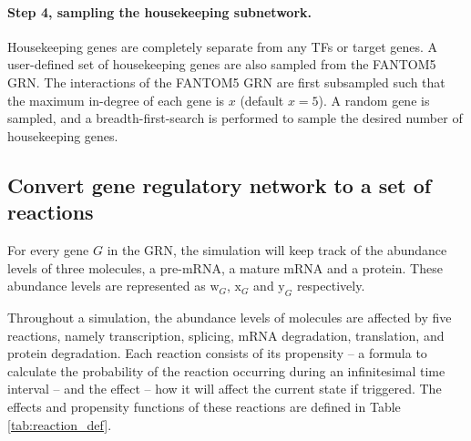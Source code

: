 \paragraph{Step 4, sampling the housekeeping subnetwork.}
Housekeeping genes are completely separate from any TFs or target genes. A user-defined set of housekeeping genes are also sampled from the FANTOM5 GRN. The interactions of the FANTOM5 GRN are first subsampled such that the maximum in-degree of each gene is $x$ (default $x=5$). A random gene is sampled, and a breadth-first-search is performed to sample the desired number of housekeeping genes.

\subsection{Convert gene regulatory network to a set of reactions} \label{sec:reactions}
\newcommand{\w}[1]{\text{w}_{#1}}
\newcommand{\x}[1]{\text{x}_{#1}}
\newcommand{\y}[1]{\text{y}_{#1}}


\newcommand{\rs}[1]{\text{R}_{#1}}
\newcommand{\rp}[1]{\text{R}^+_{#1}}
\newcommand{\rn}[1]{\text{R}^-_{#1}}

\newcommand{\wpr}[1]{\text{wpr}_{#1}}
\newcommand{\wsr}[1]{\text{wsr}_{#1}}
\newcommand{\xdr}[1]{\text{xdr}_{#1}}
\newcommand{\ypr}[1]{\text{ypr}_{#1}}
\newcommand{\ydr}[1]{\text{ydr}_{#1}}

\newcommand{\str}[1]{\text{str}_{#1}}
\newcommand{\co}[1]{\text{co}_{#1}}
\newcommand{\ind}[1]{\text{ind}_{#1}}
\newcommand{\hmy}[1]{\text{hmy}_{#1}}
\newcommand{\reg}[1]{\text{reg}_{#1}}
\newcommand{\ba}[1]{\text{ba}_{#1}}

For every gene $G$ in the GRN, the simulation will keep track of the abundance levels of three molecules, a pre-mRNA, a mature mRNA and a protein. These abundance levels are represented as $\w G$, $\x G$ and $\y G$ respectively. 

Throughout a simulation, the abundance levels of molecules are affected by five reactions, namely transcription, splicing, mRNA degradation, translation, and protein degradation. Each reaction consists of its propensity -- a formula to calculate the probability of the reaction occurring during an infinitesimal time interval -- and the effect -- how it will affect the current state if triggered. The effects and propensity functions of these reactions are defined in Table \ref{tab:reaction_def}.



